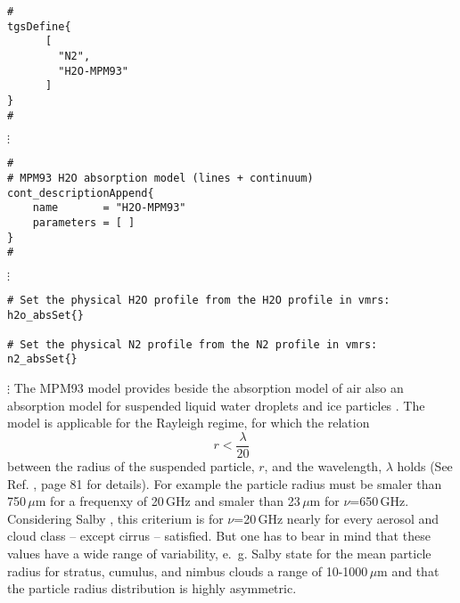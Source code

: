 
\begin{verbatim}
#
tgsDefine{
      [ 
        "N2",
        "H2O-MPM93"
      ] 
}
#
\end{verbatim}
$\vdots$
\begin{verbatim}
#
# MPM93 H2O absorption model (lines + continuum)
cont_descriptionAppend{
    name       = "H2O-MPM93"
    parameters = [ ]
}
#
\end{verbatim}
$\vdots$
\begin{verbatim}
# Set the physical H2O profile from the H2O profile in vmrs:
h2o_absSet{}

# Set the physical N2 profile from the N2 profile in vmrs:
n2_absSet{}
\end{verbatim}
$\vdots$
%
%
%
%
\label{subsec:lipartabs}
% 
The MPM93 model provides beside the absorption model of air also 
an absorption model for suspended liquid water droplets and ice 
particles \cite{liebe:89b,liebeetal:91,hufford:91,liebeetal:93}. 
The model is applicable for the Rayleigh regime, for which the
relation  
\begin{equation}
 \label{eq:MPM93ralrel}
 r < \frac{\lambda}{20}
\end{equation} 
between the radius of the suspended particle, $r$, and the 
wavelength, $\lambda$ holds (See Ref. \cite{brussaard:95}, 
page 81 for details). For example the particle radius must be 
smaler than 750\,$\mu$m for a frequenxy of 20\,GHz and smaler than 
23\,$\mu$m for $\nu$=650\,GHz. Considering Salby \cite{salby:96}, 
this criterium is for $\nu$=20\,GHz nearly for every aerosol and 
cloud class -- except cirrus -- satisfied. But one has to bear in mind
that these values have a wide range of variability, e.~g. Salby
state for the mean particle radius for stratus, cumulus, and nimbus
clouds a range of 10-1000\,$\mu$m and that the particle radius
distribution is highly asymmetric.

